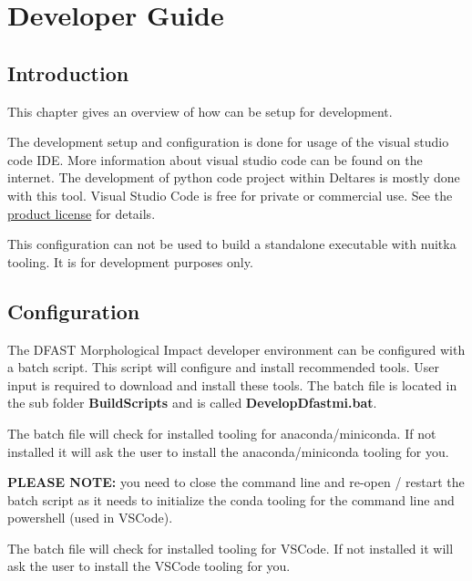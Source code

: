 \chapter{Developer Guide}

\section{Introduction}

This chapter gives an overview of how \dfastmi can be setup for development.

The development setup and configuration is done for usage of the visual studio code IDE. More information about visual studio code can be found on the internet.
The development of python code project within Deltares is mostly done with this tool. Visual Studio Code is free for private or commercial use. See the \href{https://code.visualstudio.com/license}{product license} for details.

\begin{Remark}
	\item This configuration can not be used to build a standalone executable with nuitka tooling. It is for development purposes only.
\end{Remark}

\section{Configuration}
The DFAST Morphological Impact developer environment can be configured with a batch script. This script will configure and install recommended tools. User input is required to download and install these tools. The batch file is located in the sub folder \textbf{BuildScripts} and is called \textbf{DevelopDfastmi.bat}.

The batch file will check for installed tooling for anaconda/miniconda. If not installed it will ask the user to install the anaconda/miniconda tooling for you. 

\begin{Remark}
	\item \textbf{PLEASE NOTE:} you need to close the command line and re-open / restart the batch script as it needs to initialize the conda tooling for the command line and powershell (used in VSCode).
\end{Remark}

The batch file will check for installed tooling for VSCode. If not installed it will ask the user to install the VSCode tooling for you. 

